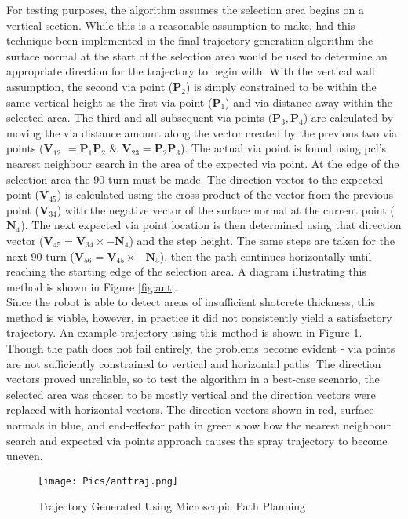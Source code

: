 For testing purposes, the algorithm assumes the selection area begins on a vertical section. While this is a reasonable assumption to make, had this technique been implemented in the final trajectory generation algorithm the surface normal at the start of the selection area would be used to determine an appropriate direction for the trajectory to begin with. With the vertical wall assumption, the second via point ($\mathbf{P}_2$) is simply constrained to be within the same vertical height as the first via point ($\mathbf{P}_1$) and via distance away within the selected area. The third and all subsequent via points ($\mathbf{P}_3,\mathbf{P}_4$) are calculated by moving the via distance amount along the vector created by the previous two via points ($\mathbf{V}_{12}\hspace{4pt} = \mathbf{P}_1\mathbf{P}_2\hspace{4pt} \& \hspace{4pt}\mathbf{V}_{23} = \mathbf{P}_2\mathbf{P}_3$). The actual via point is found using \acrshort{pcl}'s  nearest neighbour search in the area of the expected via point. At the edge of the selection area the 90\degree\hspace{0pt} turn must be made. The direction vector to the expected point ($\mathbf{V}_{45}$) is calculated using the cross product of the vector from the previous point ($\mathbf{V}_{34}$) with the negative vector of the surface normal at the current point ($\mathbf{N}_4$). The next expected via point location is then determined using that direction vector ($\mathbf{V}_{45} = \mathbf{V}_{34} \times \mathbf{-N}_4$) and the step height. The same steps are taken for the next 90\degree\hspace{0pt} turn ($\mathbf{V}_{56} = \mathbf{V}_{45} \times \mathbf{-N}_5$), then the path continues horizontally until reaching the starting edge of the selection area. A diagram illustrating this method is shown in Figure \ref{fig:ant}.\\


Since the robot is able to detect areas of insufficient shotcrete thickness, this method is viable, however, in practice it did not consistently yield a satisfactory trajectory. An example trajectory using this method is shown in Figure \ref{fig:anttraj}. Though the path does not fail entirely, the problems become evident - via points are not sufficiently constrained to vertical and horizontal paths. The direction vectors proved unreliable, so to test the algorithm in a best-case scenario, the selected area was chosen to be mostly vertical and the direction vectors were replaced with horizontal vectors. The direction vectors shown in red, surface normals in blue, and end-effector path in green show how the nearest neighbour search and expected via points approach causes the spray trajectory to become uneven.\\
\clearpage
\begin{figure}[h]
    \centering
    \texttt{[image: Pics/anttraj.png]}
    \caption{Trajectory Generated Using Microscopic Path Planning}
    \label{fig:anttraj}
\end{figure}

